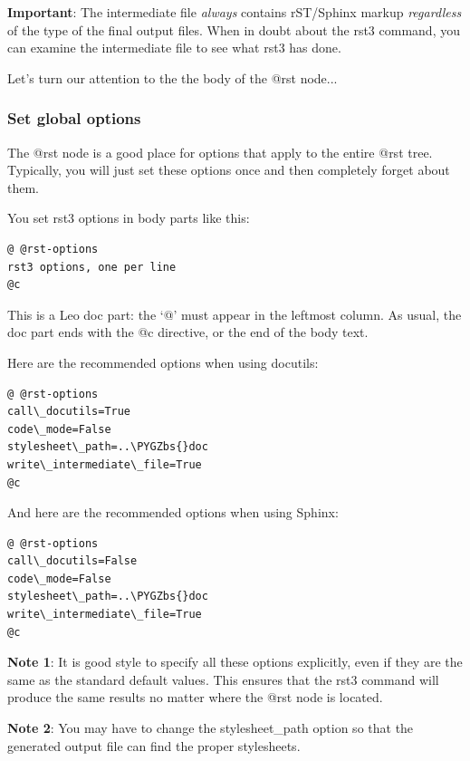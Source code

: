 \documentclass[a4paper,10pt,english]{sphinxmanual}
\def\PYGZbs{\char`\\}
\begin{document}
\textbf{Important}: The intermediate file \emph{always} contains rST/Sphinx markup
\emph{regardless} of the type of the final output files. When in doubt about the rst3
command, you can examine the intermediate file to see what rst3 has done.

Let's turn our attention to the the body of the @rst node...


\subsubsection{Set global options}
\label{rstplugin3:set-global-options}
The @rst node is a good place for options that apply to the entire @rst
tree. Typically, you will just set these options once and then completely forget
about them.

You set rst3 options in body parts like this:

\begin{Verbatim}[commandchars=\\\{\}]
@ @rst-options
rst3 options, one per line
@c
\end{Verbatim}

This is a Leo doc part: the `@' must appear in the leftmost column. As usual,
the doc part ends with the @c directive, or the end of the body text.

Here are the recommended options when using docutils:

\begin{Verbatim}[commandchars=\\\{\}]
@ @rst-options
call\_docutils=True
code\_mode=False
stylesheet\_path=..\PYGZbs{}doc
write\_intermediate\_file=True
@c
\end{Verbatim}

And here are the recommended options when using Sphinx:

\begin{Verbatim}[commandchars=\\\{\}]
@ @rst-options
call\_docutils=False
code\_mode=False
stylesheet\_path=..\PYGZbs{}doc
write\_intermediate\_file=True
@c
\end{Verbatim}

\textbf{Note 1}: It is good style to specify all these options explicitly, even if they are
the same as the standard default values. This ensures that the rst3 command
will produce the same results no matter where the @rst node is located.

\textbf{Note 2}: You may have to change the stylesheet\_path option so that the
generated output file can find the proper stylesheets.
\end{document}
